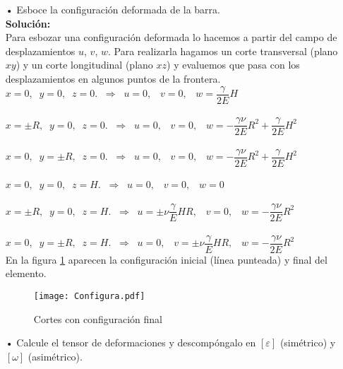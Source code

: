 \documentclass[../notas medios.tex]{subfiles}
\begin{document}
\begin{enumerate}

	\item[•] Esboce la configuración deformada de la barra.\\
	
	\textbf{Solución:}\\
	
	Para esbozar una configuración deformada lo hacemos a partir del campo de desplazamientos $u$, $v$, $w$. Para realizarla  hagamos un corte transversal (plano $xy$) y un corte longitudinal (plano $xz$) y evaluemos que pasa con los desplazamientos en algunos puntos de la frontera. \\
	
$x = 0,  \;\;  y = 0,  \;\; z = 0.  \;\;   \Longrightarrow  \;\; u = 0,  \;\;\;   v = 0, \;\;\;   w = \dfrac{\gamma}{2E} H $\\\\
$x =\pm R,  \;\;  y = 0,  \;\; z = 0.  \;\;   \Longrightarrow  \;\; u = 0,  \;\;\;   v = 0, \;\;\;   w = - \dfrac{\gamma \nu}{2E} R^2 +  \dfrac{\gamma}{2E} H^2$  \\\\
$x =0,  \;\;  y = \pm R,  \;\; z = 0.  \;\;   \Longrightarrow  \;\; u = 0,  \;\;\;   v = 0, \;\;\;   w = - \dfrac{\gamma \nu}{2E} R^2 +  \dfrac{\gamma}{2E} H^2$  \\\\
$x = 0,  \;\;  y = 0,  \;\; z = H.  \;\;   \Longrightarrow  \;\; u = 0,  \;\;\;   v = 0, \;\;\;   w = 0$  \\\\
$x = \pm R,  \;\;  y = 0,  \;\; z = H.  \;\;   \Longrightarrow  \;\; u =\pm \nu \dfrac{\gamma}{E} H R,   \;\;\;   v = 0, \;\;\;   w = - \dfrac{\gamma \nu}{2E} R^2$  \\\\
$x = 0,  \;\;  y = \pm R,  \;\; z = H.  \;\;   \Longrightarrow  \;\; u =0,   \;\;\;   v = \pm \nu \dfrac{\gamma}{E} H R, \;\;\;   w = - \dfrac{\gamma \nu}{2E} R^2$  \\

En la figura \cref{ConDef} aparecen la configuración inicial (línea punteada) y final del elemento. 

\begin{figure}[h]
	\centering
	\texttt{[image: Configura.pdf]}
	\caption{Cortes con configuración final}
	 \label{ConDef}
\end{figure}
%	
	\item[•] Calcule el tensor de deformaciones y descompóngalo en $[\varepsilon]$ (sim\'etrico) y $[\omega]$ (asim\'etrico).
		

\end{enumerate}
\end{document}
